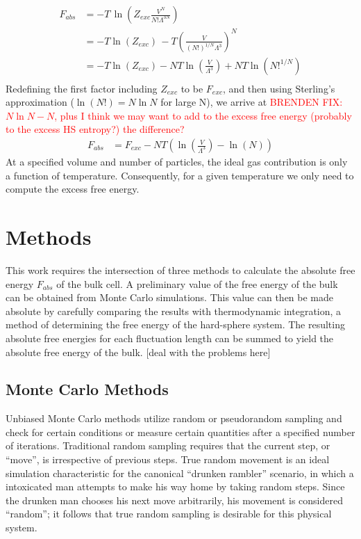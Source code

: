 \documentclass[12pt]{article}
\begin{document}
\begin{align}
    F_{abs} &= -T\,\ln\left(Z_{exc} \frac{V^N}{N!\Lambda^{3N}}\right)\\
    &= -T\ln\left(Z_{exc}\right)\, -T\left(\frac{V}{(N!)^{1/N}\Lambda^3} \right)^N\\
    &= -T\ln\left(Z_{exc}\right) - NT\ln\left(\frac{V}{\Lambda^3}\right) + NT\ln\left(N!^{1/N}\right)\\ 
\end{align}
Redefining the first factor including $Z_{exc}$ to be $F_{exc}$, and then using Sterling's approximation ($\ln(N!) = N\ln N$ for large N), we arrive at \textcolor{red}{BRENDEN FIX: $N\ln N - N$, plus I think we may want to add to the excess free energy (probably to the excess HS entropy?) the difference?}
\begin{align}
    F_{abs} &= F_{exc} - NT\left(\ln\left(\frac{V}{\Lambda^3}\right) - \ln\left(N\right)\right)
\end{align}
At a specified volume and number of particles, the ideal gas contribution is only a function of temperature. Consequently, for a given temperature we only need to compute the excess free energy.

\section{Methods}
This work requires the intersection of three methods to calculate the absolute free energy $F_{abs}$ of the bulk cell. A preliminary value of the free energy of the bulk can be obtained from Monte Carlo simulations. This value can then be made absolute by carefully comparing the results with thermodynamic integration, a method of determining the free energy of the hard-sphere system. The resulting absolute free energies for each fluctuation length can be summed to yield the absolute free energy of the bulk. {\color{red}[deal with the problems here]} 

\subsection{Monte Carlo Methods}

Unbiased Monte Carlo methods utilize random or pseudorandom sampling and check for certain conditions or measure certain quantities after a specified number of iterations. Traditional random sampling requires that the current step, or ``move'', is irrespective of previous steps. True random movement is an ideal simulation characteristic for the canonical ``drunken rambler'' scenario, in which a intoxicated man attempts to make his way home by taking random steps. Since the drunken man chooses his next move arbitrarily, his movement is considered ``random''; it follows that true random sampling is desirable for this physical system. \\
\end{document}

